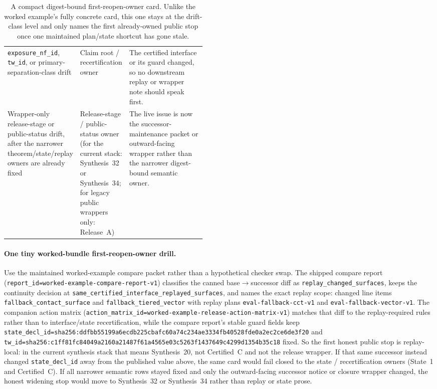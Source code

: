 \documentclass[11pt]{article}
\begin{document}
\begin{table}[t]
\begin{tabularx}{\linewidth}{@{}>{\raggedright\arraybackslash}p{0.22\linewidth} >{\raggedright\arraybackslash}p{0.24\linewidth} X@{}}
\texttt{exposure\_nf\_id}, \texttt{tw\_id}, or primary-separation-class drift & Claim root / recertification owner & The certified interface or its guard changed, so no downstream replay or wrapper note should speak first. \\
Wrapper-only release-stage or public-status drift, after the narrower theorem/state/replay owners are already fixed & Release-stage / public-status owner (for the current stack: Synthesis~32 or Synthesis~34; for legacy public wrappers only: Release~A) & The live issue is now the successor-maintenance packet or outward-facing wrapper rather than the narrower digest-bound semantic owner. \\
\bottomrule
\end{tabularx}
\caption{A compact digest-bound first-reopen-owner card. Unlike the worked example's fully concrete card, this one stays at the drift-class level and only names the first already-owned public stop once one maintained plan/state shortcut has gone stale.}
\label{tab:firstreopenowner}
\end{table}

\paragraph{One tiny worked-bundle first-reopen-owner drill.}
Use the maintained worked-example compare packet rather than a hypothetical checker swap.
The shipped compare report  (\texttt{report\_id=worked-example-compare-report-v1}) classifies the canned base$\to$successor diff as \texttt{replay\_changed\_surfaces}, keeps the continuity decision at \texttt{same\_certified\_interface\_replayed\_surfaces}, and names the exact replay scope: changed line items \texttt{fallback\_contact\_surface} and \texttt{fallback\_tiered\_vector} with replay plans \texttt{eval-fallback-cct-v1} and \texttt{eval-fallback-vector-v1}.
The companion action matrix  (\texttt{action\_matrix\_id=worked-example-release-action-matrix-v1}) matches that diff to the replay-required rules rather than to interface/state recertification, while the compare report's stable guard fields keep \texttt{state\_decl\_id=sha256:ddfbb55199a6ecdb225cbafc60a74c234ae3334fb40528fde0a2ec2ce6de3f20} and \texttt{tw\_id=sha256:c1ff81fc84049a2160a21487f61a4565e03c5263f1437649c4299d1354b35c18} fixed.
So the first honest public stop is replay-local: in the current synthesis stack that means Synthesis~20, not Certified~C and not the release wrapper.
If that same successor instead changed \texttt{state\_decl\_id} away from the published value above, the same card would fail closed to the state / recertification owners (State~1 and Certified~C).
If all narrower semantic rows stayed fixed and only the outward-facing successor notice or closure wrapper changed, the honest widening stop would move to Synthesis~32 or Synthesis~34 rather than replay or state prose.\cite{series:workedexample,series:state1,series:recert,series:receiptaccounting,series:conditionalbudget,series:statusenvelopes,series:releasespine,series:auditorreplay}
\end{document}
